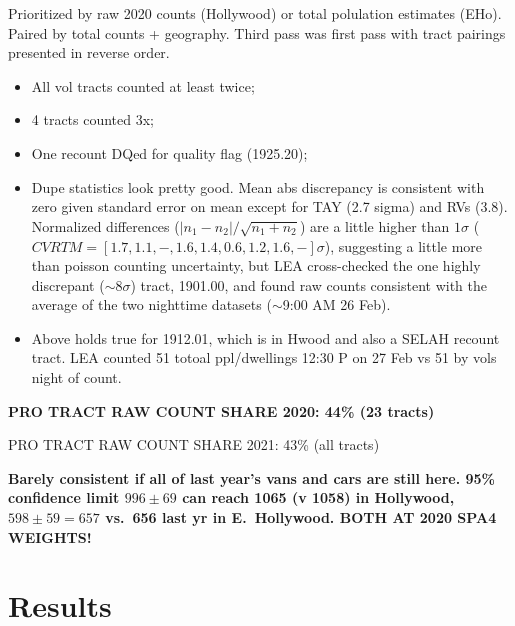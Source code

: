 \documentclass[11pt,twocolumn]{article}
\def\bfr{\bf\color{red}}
\begin{document}
Prioritized by raw 2020 counts (Hollywood) or total polulation estimates (EHo). 
Paired by total counts + geography. 
Third pass was first pass with tract pairings presented in reverse order.
\begin{itemize}
	\item All vol tracts counted at least twice;
	\item 4 tracts counted 3x;
	\item One recount DQed for quality flag (1925.20);
	\item Dupe statistics look pretty good. Mean abs discrepancy is consistent
		with zero given standard error on mean except for TAY (2.7 sigma) and RVs (3.8).
		Normalized differences ($|n_{1}-n_{2}|/\sqrt{n_{1}+n_{2}}$) are a little higher
		than $1\sigma$ ($CVRTM=[1.7, 1.1, -, 1.6, 1.4, 0.6, 1.2, 1.6, -]\sigma$), suggesting 
		a little more than poisson counting uncertainty, but LEA cross-checked the one
		highly discrepant ($\sim$8$\sigma$) tract, 1901.00, and found raw counts consistent
		with the average of the two nighttime datasets ($\sim$9:00 AM 26 Feb). 
	\item Above holds true for 1912.01, which is in Hwood and also a SELAH recount tract. LEA
		counted 51 totoal ppl/dwellings 12:30 P on 27 Feb vs 51 by vols night of count.
\end{itemize}

{\bfr PRO TRACT RAW COUNT SHARE 2020: 44\% (23 tracts)

PRO TRACT RAW COUNT SHARE 2021: 43\% (all tracts)}

{\bfr Barely consistent if all of last year's vans and cars are still here. 95\% confidence limit $996\pm69$ can reach 1065 (v 1058) 
in Hollywood, $598\pm 59= 657$ vs.\ 656 last yr in E.~Hollywood. BOTH AT 2020 SPA4 WEIGHTS!}


\section{Results}
\label{sec:results}
\end{document}
